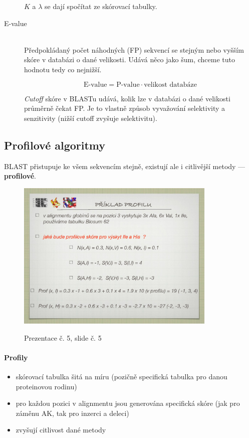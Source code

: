 \documentclass[DIV=8]{scrreprt}
\begin{document}
\begin{description}
\(K\) a \(\lambda\) se dají spočítat ze skórovací tabulky.


\item[E-value]\hfill \\
Předpokládaný počet náhodných (FP) sekvencí se stejným nebo vyšším skóre v databázi o dané velikosti. Udává něco jako šum, chceme tuto hodnotu tedy co nejnižší.

\[\text{E-value} = \text{P-value} \cdot \text{velikost databáze}\]

\emph{Cutoff} skóre v BLASTu udává, kolik lze v databázi o dané velikosti průměrně čekat FP. Je to vlastně způsob vyvažování selektivity a senzitivity (nižší cutoff zvyšuje selektivitu).

\end{description}


\subsection{Profilové algoritmy} \label{Profilové algoritmy}


BLAST přistupuje ke všem sekvencím stejně, existují ale i citlivější metody --- \textbf{profilové}.

\begin{figure}
    \caption{Prezentace č. 5, slide č. 5}
    \includegraphics[width=0.85\textwidth]{slides-5/slide-5.jpg}
    \centering
    \label{slides-5-slide-5}
\end{figure}

\paragraph{Profily}
\begin{itemize}[nosep]
    \item skórovací tabulka šitá na míru (pozičně specifická tabulka pro danou proteinovou rodinu)
    \item pro každou pozici v alignmentu jsou generována specifická skóre (jak pro záměnu AK, tak pro inzerci a deleci)
    \item zvyšují citlivost dané metody
\end{itemize}
\end{document}
